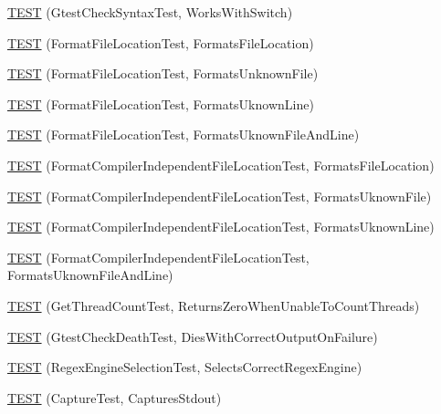 \begin{DoxyCompactItemize}
\item 
\hyperlink{namespacetesting_1_1internal_a4dfd147ff396984fca799878cb53dcea}{T\-E\-S\-T} (Gtest\-Check\-Syntax\-Test, Works\-With\-Switch)
\item 
\hyperlink{namespacetesting_1_1internal_a1a1c20d78e9e75b9c7f2b767eb62611b}{T\-E\-S\-T} (Format\-File\-Location\-Test, Formats\-File\-Location)
\item 
\hyperlink{namespacetesting_1_1internal_ace2f5407afdfb0767035d44b6758e4a0}{T\-E\-S\-T} (Format\-File\-Location\-Test, Formats\-Unknown\-File)
\item 
\hyperlink{namespacetesting_1_1internal_a17d1f472b6c1154de7b5b008b964ee32}{T\-E\-S\-T} (Format\-File\-Location\-Test, Formats\-Uknown\-Line)
\item 
\hyperlink{namespacetesting_1_1internal_a1195aaf7258c5442de7aebd95acefb9f}{T\-E\-S\-T} (Format\-File\-Location\-Test, Formats\-Uknown\-File\-And\-Line)
\item 
\hyperlink{namespacetesting_1_1internal_a9c12f8c1ebb19906e8fa0c430d139076}{T\-E\-S\-T} (Format\-Compiler\-Independent\-File\-Location\-Test, Formats\-File\-Location)
\item 
\hyperlink{namespacetesting_1_1internal_a65ad1cad17717c1b8ac4c2d4bef5e079}{T\-E\-S\-T} (Format\-Compiler\-Independent\-File\-Location\-Test, Formats\-Uknown\-File)
\item 
\hyperlink{namespacetesting_1_1internal_a0315a64a661f249628f2884080e0614f}{T\-E\-S\-T} (Format\-Compiler\-Independent\-File\-Location\-Test, Formats\-Uknown\-Line)
\item 
\hyperlink{namespacetesting_1_1internal_a8b9aee556f3dec6e67c35830ba55e0bd}{T\-E\-S\-T} (Format\-Compiler\-Independent\-File\-Location\-Test, Formats\-Uknown\-File\-And\-Line)
\item 
\hyperlink{namespacetesting_1_1internal_a5ad8299ae9325382f01b945f4f81711e}{T\-E\-S\-T} (Get\-Thread\-Count\-Test, Returns\-Zero\-When\-Unable\-To\-Count\-Threads)
\item 
\hyperlink{namespacetesting_1_1internal_afabff70df09a0e4fcda96dd36460c2b9}{T\-E\-S\-T} (Gtest\-Check\-Death\-Test, Dies\-With\-Correct\-Output\-On\-Failure)
\item 
\hyperlink{namespacetesting_1_1internal_a198f7132f76dd44d48dac54dc5d38fbb}{T\-E\-S\-T} (Regex\-Engine\-Selection\-Test, Selects\-Correct\-Regex\-Engine)
\item 
\hyperlink{namespacetesting_1_1internal_a0b658d88cea3a2fe6775b1b269c0204b}{T\-E\-S\-T} (Capture\-Test, Captures\-Stdout)
\item 

\end{DoxyCompactItemize}
